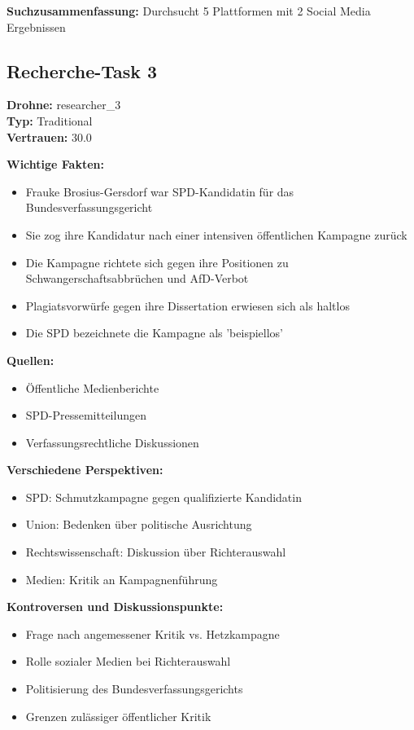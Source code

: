 \documentclass[12pt,a4paper]{article}
\begin{document}
\textbf{Suchzusammenfassung:} Durchsucht 5 Plattformen mit 2 Social Media Ergebnissen

\subsection{Recherche-Task 3}

\textbf{Drohne:} researcher\_3\\
\textbf{Typ:} Traditional\\
\textbf{Vertrauen:} 30.0%

\textbf{Wichtige Fakten:}
\begin{itemize}
\item Frauke Brosius-Gersdorf war SPD-Kandidatin für das Bundesverfassungsgericht
\item Sie zog ihre Kandidatur nach einer intensiven öffentlichen Kampagne zurück
\item Die Kampagne richtete sich gegen ihre Positionen zu Schwangerschaftsabbrüchen und AfD-Verbot
\item Plagiatsvorwürfe gegen ihre Dissertation erwiesen sich als haltlos
\item Die SPD bezeichnete die Kampagne als 'beispiellos'
\end{itemize}

\textbf{Quellen:}
\begin{itemize}
\item Öffentliche Medienberichte
\item SPD-Pressemitteilungen
\item Verfassungsrechtliche Diskussionen
\end{itemize}

\textbf{Verschiedene Perspektiven:}
\begin{itemize}
\item SPD: Schmutzkampagne gegen qualifizierte Kandidatin
\item Union: Bedenken über politische Ausrichtung
\item Rechtswissenschaft: Diskussion über Richterauswahl
\item Medien: Kritik an Kampagnenführung
\end{itemize}

\textbf{Kontroversen und Diskussionspunkte:}
\begin{itemize}
\item Frage nach angemessener Kritik vs. Hetzkampagne
\item Rolle sozialer Medien bei Richterauswahl
\item Politisierung des Bundesverfassungsgerichts
\item Grenzen zulässiger öffentlicher Kritik
\end{itemize}
\end{document}
